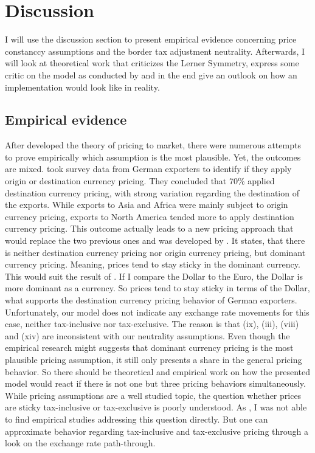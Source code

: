 \section{Discussion} \label{discussion}
I will use the discussion section to present empirical evidence concerning price constanccy assumptions and the border tax adjustment neutrality. Afterwards, I will look at theoretical work that criticizes the Lerner Symmetry, express some critic on the model as conducted by \cite{buiter} and in the end give an outlook on how an implementation would look like in reality.


\subsection{Empirical evidence}
After \cite{krugman1986pricing} developed the theory of pricing to market, there were numerous attempts to prove empirically which assumption is the most plausible. Yet, the outcomes are mixed. \cite{fendel2008local} took survey data from German exporters to identify if they apply origin or destination currency pricing. They concluded that 70\% applied destination currency pricing, with strong variation regarding the destination of the exports. While exports to Asia and Africa were mainly subject to origin currency pricing, exports to North America tended more to apply destination currency pricing. This outcome actually leads to a new pricing approach that would replace the two previous ones and was developed by \cite{casas2017dominant}. It states, that there is neither destination currency pricing nor origin currency pricing, but dominant currency pricing. Meaning, prices tend to stay sticky in the dominant currency. This would suit the result of \cite{fendel2008local}. If I compare the Dollar to the Euro, the Dollar is more dominant as a currency. So prices tend to stay sticky in terms of the Dollar, what supports the destination currency pricing behavior of German exporters.%
Unfortunately, our model does not indicate any exchange rate movements for this case, neither tax-inclusive nor tax-exclusive. The reason is that (ix), (iii), (viii) and (xiv) are inconsistent with our neutrality assumptions. Even though the empirical research might suggests that dominant currency pricing is the most plausible pricing assumption, it still only presents a share in the general pricing behavior. So there should be theoretical and empirical work on how the presented model would react if there is not one but three pricing behaviors simultaneously. While pricing assumptions are a well studied topic, the question whether prices are sticky tax-inclusive or tax-exclusive is poorly understood. As \cite{buiter2017exchange}, I was not able to find empirical studies addressing this question directly. But one can approximate behavior regarding tax-inclusive and tax-exclusive pricing through a look on the exchange rate path-through.
